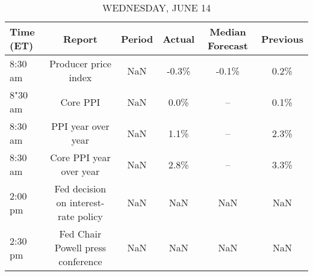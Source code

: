 \documentclass{article}%
\begin{document}
\begin{table}[htbp]%
\caption{WEDNESDAY, JUNE 14}%
\centering%
\begin{adjustbox}{width=1\textwidth}%
\begin{tabular}{lccccc}
\toprule
Time (ET) &                               Report & Period & Actual & Median Forecast & Previous \\
\midrule
  8:30 am &                 Producer price index &    NaN &  -0.3\% &           -0.1\% &     0.2\% \\
  8"30 am &                             Core PPI &    NaN &   0.0\% &              -- &     0.1\% \\
  8:30 am &                   PPI year over year &    NaN &   1.1\% &              -- &     2.3\% \\
  8:30 am &              Core PPI year over year &    NaN &   2.8\% &              -- &     3.3\% \\
  2:00 pm & Fed decision on interest-rate policy &    NaN &    NaN &             NaN &      NaN \\
  2:30 pm &    Fed Chair Powell press conference &    NaN &    NaN &             NaN &      NaN \\
\bottomrule
\end{tabular}
%
\end{adjustbox}%
\end{table}

%
\end{document}
